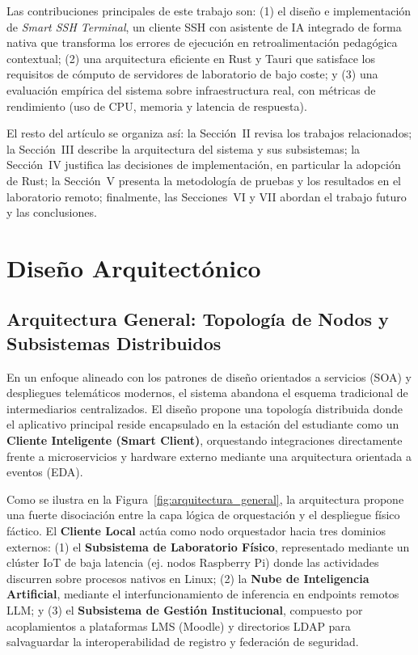 \documentclass[conference]{IEEEtran} %
\begin{document}
Las contribuciones principales de este trabajo son: (1) el diseño e 
implementación de \textit{Smart SSH Terminal}, un cliente SSH con asistente 
de IA integrado de forma nativa que transforma los errores de ejecución en 
retroalimentación pedagógica contextual; (2) una arquitectura eficiente en 
Rust y Tauri que satisface los requisitos de cómputo de servidores de 
laboratorio de bajo coste; y (3) una evaluación empírica del sistema sobre 
infraestructura real, con métricas de rendimiento (uso de CPU, memoria y 
latencia de respuesta). 

El resto del artículo se organiza así: la Sección~II revisa los trabajos 
relacionados; la Sección~III describe la arquitectura del sistema y sus 
subsistemas; la Sección~IV justifica las decisiones de implementación, en 
 particular la adopción de Rust; la Sección~V presenta la metodología de 
pruebas y los resultados en el laboratorio remoto; finalmente, las 
Secciones~VI y VII abordan el trabajo futuro y las conclusiones.

\section{Diseño Arquitectónico}

\subsection{Arquitectura General: Topología de Nodos y Subsistemas Distribuidos}

En un enfoque alineado con los patrones de diseño orientados a servicios (SOA) y despliegues telemáticos modernos, el sistema abandona el esquema tradicional de intermediarios centralizados. El diseño propone una topología distribuida donde el aplicativo principal reside encapsulado en la estación del estudiante como un \textbf{Cliente Inteligente (Smart Client)}, orquestando integraciones directamente frente a microservicios y hardware externo mediante una arquitectura orientada a eventos (EDA).

Como se ilustra en la Figura~\ref{fig:arquitectura_general}, la arquitectura propone una fuerte disociación entre la capa lógica de orquestación y el despliegue físico fáctico. El \textbf{Cliente Local} actúa como nodo orquestador hacia tres dominios externos: (1) el \textbf{Subsistema de Laboratorio Físico}, representado mediante un clúster IoT de baja latencia (ej. nodos Raspberry Pi) donde las actividades discurren sobre procesos nativos en Linux; (2) la \textbf{Nube de Inteligencia Artificial}, mediante el interfuncionamiento de inferencia en endpoints remotos LLM; y (3) el \textbf{Subsistema de Gestión Institucional}, compuesto por acoplamientos a plataformas LMS (Moodle) y directorios LDAP para salvaguardar la interoperabilidad de registro y federación de seguridad.
\end{document}
